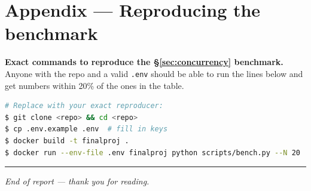 \documentclass[11pt,a4paper]{article}
\begin{document}
\appendix
\section{Appendix --- Reproducing the benchmark}
\textbf{Exact commands to reproduce the §\ref{sec:concurrency} benchmark.} Anyone with the repo and a valid \texttt{.env} should be able to run the lines below and get numbers within 20\% of the ones in the table.

\begin{lstlisting}[style=python,language=bash,numbers=none]
# Replace with your exact reproducer:
$ git clone <repo> && cd <repo>
$ cp .env.example .env  # fill in keys
$ docker build -t finalproj .
$ docker run --env-file .env finalproj python scripts/bench.py --N 20
\end{lstlisting}

\vspace{1em}\hrule\vspace{0.6em}
\noindent\small\textit{End of report --- thank you for reading.}
\end{document}
